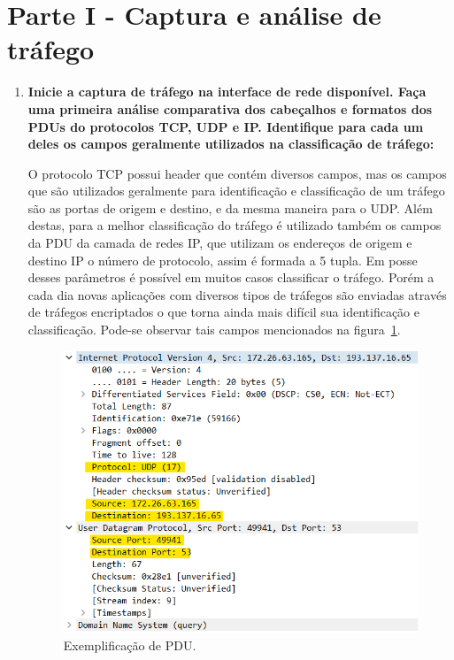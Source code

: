 \documentclass{llncs}
\begin{document}
  \section{Parte I - Captura e análise de tráfego}


  \begin{enumerate}[\textbf{a)}]
    \item \textbf{ Inicie a captura de tráfego na interface de rede disponível. Faça uma primeira análise comparativa dos cabeçalhos e formatos dos PDUs do protocolos TCP, UDP e IP. Identifique para cada um deles os campos geralmente utilizados na classificação de tráfego:}
    \vspace{5mm}
      \par O protocolo TCP possui header que contém diversos campos, mas os campos que são utilizados geralmente para identificação e classificação de um tráfego são as portas de origem e destino, e da mesma maneira para o UDP. Além destas, para a melhor classificação do tráfego é utilizado também os campos da PDU da camada de redes IP, que utilizam os endereços de origem e destino IP o número de protocolo, assim é formada a 5 tupla. Em posse desses parâmetros é possível em muitos casos classificar o tráfego. Porém a cada dia novas aplicações com diversos tipos de tráfegos são enviadas através de tráfegos encriptados o que torna ainda mais difícil sua identificação e classificação. Pode-se observar tais campos mencionados na figura~\ref{fig:PDU}.
      
    
    \begin{figure}[h]
      \includegraphics[scale=0.65]{PDU.png}
      \centering
      \caption{Exemplificação de PDU.}
      \label{fig:PDU}
      \end{figure}
  \end{enumerate}
\end{document}
